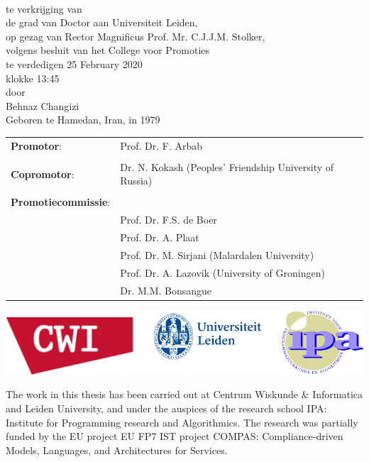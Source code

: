 \newpage
{
 \vspace*{1.5cm}
  \\
 \vspace*{1.5cm}
te verkrijging van
 \\ de grad van Doctor aan Universiteit Leiden,
 \\
op gezag van Rector Magnificus Prof. Mr. C.J.J.M. Stolker,
 \\
volgens besluit van het College voor Promoties
\\
te verdedigen 25 February 2020
\\
klokke 13:45 \\
 \vspace*{3cm}
door
 \\
  \vspace*{.7cm}
Behnaz Changizi
 \\
   \vspace*{.7cm} \hspace*{3.3cm}
Geboren te Hamedan, Iran, in 1979
}



\newpage
 \vspace*{1.5cm}
 \begin{flushleft}
\begin{tabular}{ l l }
 {\textbf{Promotor}}:  & Prof. Dr. F. Arbab \\ 
 &\\
	{\textbf{Copromotor}}: &  Dr. N. Kokash  (Peoples' Friendship University of Russia)  \\ 
 &\\
{\textbf{Promotiecommissie}}: &  \\  
 &Prof. Dr. F.S. de Boer \\  
 & Prof. Dr. A. Plaat \\ 
& Prof. Dr. M. Sirjani (Malardalen University)\\
&Prof. Dr. A. Lazovik (University of Groningen) \\
& Dr. M.M. Bonsangue
\end{tabular}
\end{flushleft} 


\vspace{7cm}
\begin{center}
\includegraphics{img/ipa}
\end{center}
The work in this thesis has been carried out at Centrum Wiskunde \& Informatica and Leiden University, and under the auspices of the research school
IPA: Institute for Programming research and Algorithmics. The research was
partially funded by the EU project EU FP7 IST project COMPAS: Compliance-driven Models, Languages, and Architectures for Services.
